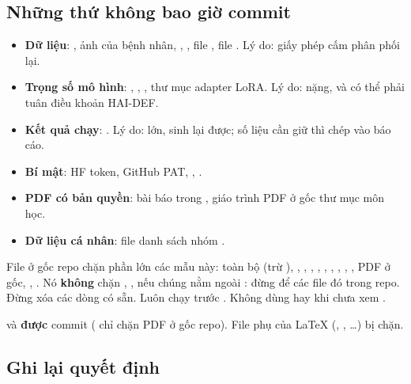 \subsection{Những thứ không bao giờ commit}

\begin{dangerbox}
\begin{itemize}
\item \textbf{Dữ liệu}: , ảnh  của bệnh nhân, , , file , file . Lý do: giấy phép cấm phân phối lại.
\item \textbf{Trọng số mô hình}: , , , thư mục adapter LoRA. Lý do: nặng, và có thể phải tuân điều khoản HAI-DEF.
\item \textbf{Kết quả chạy}: . Lý do: lớn, sinh lại được; số liệu cần giữ thì chép vào báo cáo.
\item \textbf{Bí mật}: HF token, GitHub PAT, , .
\item \textbf{PDF có bản quyền}: bài báo trong , giáo trình PDF ở gốc thư mục môn học.
\item \textbf{Dữ liệu cá nhân}: file danh sách nhóm .
\end{itemize}
File  ở gốc repo chặn phần lớn các mẫu này: toàn bộ  (trừ ), , ,
, , , , , , , PDF ở gốc, , .
Nó \textbf{không} chặn , ,  nếu chúng nằm ngoài : đừng để các file đó trong repo. Đừng xóa các dòng có sẵn. Luôn chạy  trước .
Không dùng  hay  khi chưa xem .
\end{dangerbox}

\begin{warnbox}
 và  \textbf{được} commit ( chỉ chặn PDF ở gốc repo).
File phụ của LaTeX (, , \ldots) bị chặn.
\end{warnbox}

\subsection{Ghi lại quyết định}

